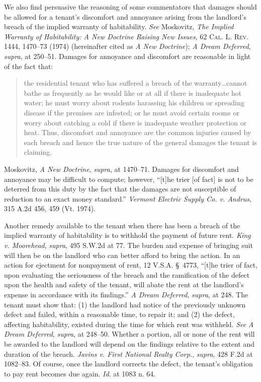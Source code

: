 We also find persuasive the reasoning of some commentators that damages should
be allowed for a tenant's discomfort and annoyance arising from the landlord's
breach of the implied warranty of habitability. \textit{See} Moskovitz,
\textit{The Implied Warranty of Habitability: A New Doctrine Raising New
Issues}, 62 \textsc{Cal. L. Rev}. 1444, 1470--73 (1974) (hereinafter cited as
\textit{A New Doctrine}); \textit{A Dream Deferred}, \textit{supra}, at
250--51. Damages for annoyance and discomfort are reasonable in light of the
fact that:  
\begin{quote}
the residential tenant who has suffered a breach of the warranty\ldots cannot
bathe as frequently as he would like or at all if there is inadequate hot
water; he must worry about rodents harassing his children or spreading disease
if the premises are infested; or he must avoid certain rooms or worry about
catching a cold if there is inadequate weather protection or heat. Thus,
discomfort and annoyance are the common injuries caused by each breach and
hence the true nature of the general damages the tenant is claiming.  
\end{quote}
Moskovitz, \textit{A New Doctrine}, \textit{supra}, at 1470--71. Damages for
discomfort and annoyance may be difficult to compute; however, ``[t]he trier
[of fact] is not to be deterred from this duty by the fact that the damages are
not susceptible of reduction to an exact money standard.'' \textit{Vermont
Electric Supply Co. v. Andrus}, 315 A.2d 456, 459 (Vt. 1974).

Another remedy available to the tenant when there has been a breach of the
implied warranty of habitability is to withhold the payment of future rent.
\textit{King v. Moorehead}, \textit{supra}, 495 S.W.2d at 77. The burden and
expense of bringing suit will then be on the landlord who can better afford to
bring the action. In an action for ejectment for nonpayment of rent, 12 V.S.A.
\S~4773, ``[t]he trier of fact, upon evaluating the seriousness of the breach
and the ramification of the defect upon the health and safety of the tenant,
will abate the rent at the landlord's expense in accordance with its
findings.'' \textit{A Dream Deferred}, \textit{supra}, at 248. The tenant must
show that: (1) the landlord had notice of the previously unknown defect and
failed, within a reasonable time, to repair it; and (2) the defect, affecting
habitability, existed during the time for which rent was withheld. \textit{See}
\textit{A Dream Deferred}, \textit{supra}, at 248--50. Whether a portion, all
or none of the rent will be awarded to the landlord will depend on the findings
relative to the extent and duration of the breach. \textit{Javins v. First
National Realty Corp.}, \textit{supra}, 428 F.2d at 1082--83. Of course, once
the landlord corrects the defect, the tenant's obligation to pay rent becomes
due again. \textit{Id}. at 1083 n. 64.

